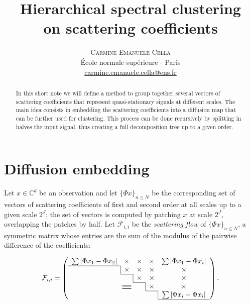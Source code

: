 \documentclass[twoside]{article}
\title{Hierarchical spectral clustering \\ on scattering coefficients}
\author{
\large
\textsc{Carmine-Emanuele Cella}\\[2mm] %
\normalsize \'Ecole normale sup\'erieure - Paris \\ %
\normalsize \href{mailto:carmine.emanuele.cella@ens.ft}{carmine.emanuele.cella@ens.fr} %
\vspace{-5mm}
}
\date{}
\begin{document}
\maketitle

\thispagestyle{fancy} %

\begin{abstract}
  In this short note we will define a method to group together several vectors of scattering coefficients that 
  represent quasi-stationary signals at different scales. The main idea consists in embedding the scattering 
  coefficients into a diffusion map that can be further used for clustering. This process can be done recursively 
  by splitting in halves the input signal, thus creating a full decomposition tree up to a given order.
\end{abstract}


\section{Diffusion embedding}

{L}et $x \in \mathbb{C}^d$ be an observation and let ${\{\Phi x\}}_{n \leq N}$ be the corresponding set of vectors of scattering coefficients of first and second order at all scales up to
a given scale $2^J$;  the set of vectors is computed by patching $x$ at scale $2^J$, overlapping the patches by half. 
Let $\mathcal{F}_{i,i}$ be the \emph{scattering flow} of ${\{\Phi x\}}_{n \leq N}$, a symmetric matrix whose entries are the sum of the modulus of the pairwise difference of the coefficients:

\newcommand\x{\times}
\newcommand\bigzero{\makebox(0,0){\text{\huge=}}}
\newcommand*{\bord}{\multicolumn{1}{c|}{}}
\begin{equation}
\mathcal{F}_{i,i} = 
  \left(
    \begin{array}{ccccc}
    \sum | \Phi x_1 - \Phi x_2 | & \x       & \x    & \x    & \sum | \Phi x_1  -  \Phi x_i |\\ \cline{1-1}
    \bord & \x       & \x    & \x    & \x \\ \cline{2-2}
          & \bord    & \x    & \x    & \x \\ \cline{3-3}
          & \bigzero & \bord & \x    & \x \\ \cline{4-4}
          &          &       & \bord & \sum |\Phi x_i - \Phi x_i | \\ \cline{5-5}
  \end{array}\right).
\end{equation}
\end{document}
